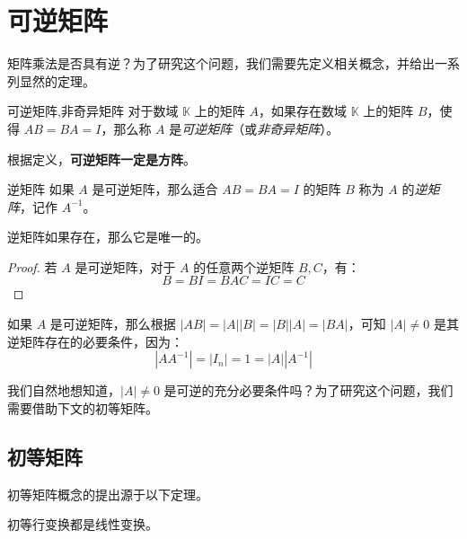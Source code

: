 
\section{可逆矩阵}

矩阵乘法是否具有逆？为了研究这个问题，我们需要先定义相关概念，并给出一系列显然的定理。

\begin{definition}{可逆矩阵,非奇异矩阵}
	对于数域 $\mathbb K$ 上的矩阵 $A$，如果存在数域 $\mathbb K$ 上的矩阵 $B$，使得 $AB = BA = I$，那么称 $A$ 是\emph{可逆矩阵}（或\emph{非奇异矩阵}）。
\end{definition}

根据定义，\textbf{可逆矩阵一定是方阵}。

\begin{definition}{逆矩阵}
	如果 $A$ 是可逆矩阵，那么适合 $AB = BA = I$ 的矩阵 $B$ 称为 $A$ 的\emph{逆矩阵}，记作 $A^{-1}$。
\end{definition}

\begin{theorem}
	逆矩阵如果存在，那么它是唯一的。
\end{theorem}

\begin{proof}
	若 $A$ 是可逆矩阵，对于 $A$ 的任意两个逆矩阵 $B, C$，有：
	$$
	B = BI = BAC = IC = C
	$$
\end{proof}

如果 $A$ 是可逆矩阵，那么根据 $|AB| = |A| |B| = |B| |A| = |BA|$，可知 $|A| \ne 0$ 是其逆矩阵存在的必要条件，因为：
$$
|A A^{-1}| = |I_n| = 1 = |A| |A^{-1}|
$$

我们自然地想知道，$|A| \ne 0$ 是可逆的充分必要条件吗？为了研究这个问题，我们需要借助下文的初等矩阵。

\subsection{初等矩阵}

初等矩阵概念的提出源于以下定理。

\begin{theorem}
	初等行变换都是线性变换。
\end{theorem}

